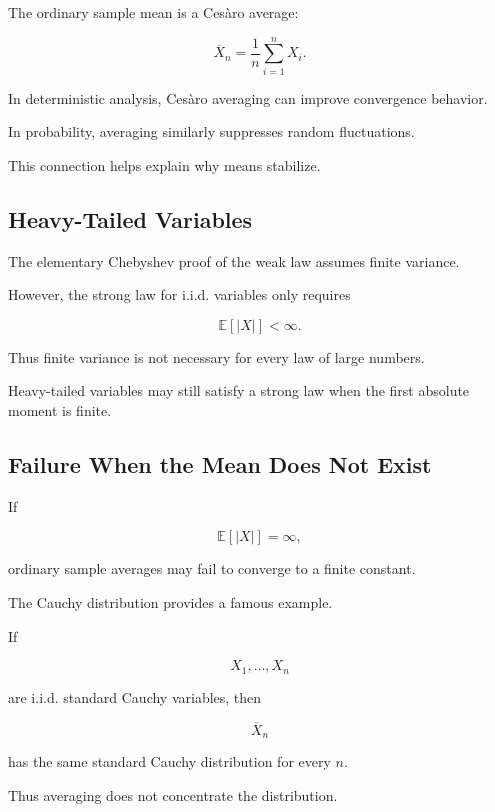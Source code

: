 The ordinary sample mean is a Cesàro average:

\[
\boxed{
\overline{X}_n
=
\frac1n
\sum_{i=1}^{n}X_i.
}
\]

In deterministic analysis, Cesàro averaging can improve convergence
behavior.

In probability, averaging similarly suppresses random fluctuations.

This connection helps explain why means stabilize.

\subsection{Heavy-Tailed Variables}
\label{subsec:heavy-tail-lln}

The elementary Chebyshev proof of the weak law assumes finite variance.

However, the strong law for i.i.d. variables only requires

\[
\boxed{
\mathbb{E}[|X|]<\infty.
}
\]

Thus finite variance is not necessary for every law of large numbers.

Heavy-tailed variables may still satisfy a strong law when the first
absolute moment is finite.

\subsection{Failure When the Mean Does Not Exist}
\label{subsec:lln-mean-does-not-exist}

If

\[
\mathbb{E}[|X|]=\infty,
\]

ordinary sample averages may fail to converge to a finite constant.

The Cauchy distribution provides a famous example.

If

\[
X_1,\ldots,X_n
\]

are i.i.d. standard Cauchy variables, then

\[
\boxed{
\overline{X}_n
}
\]

has the same standard Cauchy distribution for every \(n\).

Thus averaging does not concentrate the distribution.

